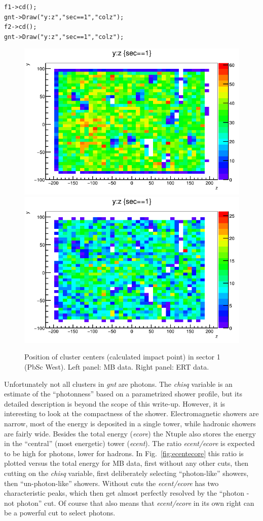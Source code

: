 \documentclass[12pt,letterpaper,aps,prc,superscriptaddress,showpacs,
longbibliography,nofootinbib,floatfix,onecolumn]{revtex4-1}
\begin{document}
\begin{verbatim}
f1->cd();
gnt->Draw("y:z","sec==1","colz");
f2->cd();
gnt->Draw("y:z","sec==1","colz");
\end{verbatim}


\begin{center}
\begin{figure}[htbp]
  \includegraphics[width=0.4\linewidth]{figs/mbsec1_yz.png}
  \includegraphics[width=0.4\linewidth]{figs/ertsec1_yz.png}
  \caption{Position of cluster centers (calculated impact point) in
    sector 1 (PbSc West).  Left panel: MB data.  Right panel: ERT data.
  }
    \label{fig:deadhot}
\end{figure}
\end{center}

Unfortunately not all clusters in {\it gnt} are photons.  The 
{\it chisq} variable is an estimate of the ``photonness'' based on a
parametrized shower profile, but its detailed description is beyond
the scope of this write-up.  However, it is interesting to look at the
compactness of the shower.  Electromagnetic showers are narrow, most
of the energy is deposited in a single tower, while
hadronic showers are fairly wide.  Besides the total energy 
({\it ecore}) the Ntuple also stores the energy in the ``central''
(most energetic) tower ({\it ecent}).  The ratio
{\it ecent/ecore} is expected to be high for photons, lower for
hadrons.  In Fig.~\ref{fig:ecentecore} this ratio is plotted versus
the total energy for MB data, first without any other cuts, then
cutting on the {\it chisq} variable, first deliberately selecting 
``photon-like'' showers, then ``un-photon-like'' showers.  Without
cuts the {\it ecent/ecore} has two characteristic peaks, which then
get almost perfectly resolved by the ``photon - not photon'' cut.  Of
course that also means that {\it ecent/ecore} in its own right can be
a powerful cut to select photons. 
\end{document}

